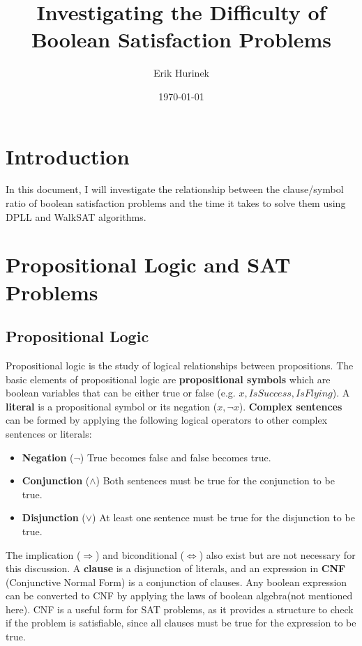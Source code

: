 \documentclass{article}
\author{Erik Hurinek}
\title{Investigating the Difficulty of Boolean Satisfaction Problems}
\date{\today}
\begin{document}
    \maketitle
    
    \section{Introduction}

    In this document, I will investigate the relationship between the clause/symbol ratio of boolean satisfaction problems and the time it takes to solve them using DPLL and WalkSAT algorithms.

    \section{Propositional Logic and SAT Problems}

    \subsection{Propositional Logic}
    Propositional logic is the study of logical relationships between propositions.\supercite{sep-logic-propositional} The basic elements of propositional logic are \textbf{propositional symbols} which are boolean variables that can be either true or false (e.g. \(x, IsSuccess, IsFlying\)). A \textbf{literal} is a propositional symbol or its negation (\(x, \neg x \)). \textbf{Complex sentences} can be formed by applying the following logical operators to other complex sentences or literals:

    \begin{itemize}
        \item \textbf{Negation} ($\neg$) True becomes false and false becomes true.
        \item \textbf{Conjunction} ($\land$) Both sentences must be true for the conjunction to be true.
        \item \textbf{Disjunction} ($\lor$) At least one sentence must be true for the disjunction to be true.
    \end{itemize}

    The implication ($\Rightarrow$) and biconditional ($\Leftrightarrow$) also exist but are not necessary for this discussion. A \textbf{clause} is a disjunction of literals, and an expression in \textbf{CNF} (Conjunctive Normal Form) is a conjunction of clauses. Any boolean expression can be converted to CNF by applying the laws of boolean algebra\supercite{Norvig_2021}(not mentioned here). CNF is a useful form for SAT problems, as it provides a structure to check if the problem is satisfiable, since all clauses must be true for the expression to be true.
\end{document}
